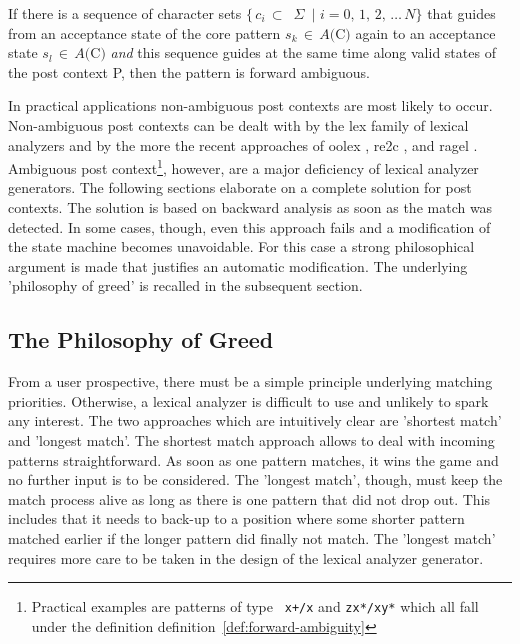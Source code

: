 \documentclass[acmtoplas]{acmtrans2m}
\newcommand{\defref}[1]{definition~\ref{def:#1}}
\newcommand{\pP}{{\sf P}}
\newcommand{\pC}{{\sf C}}
\begin{document}
\begin{samepage}
\begin{definition}\label{def:forward-ambiguity}
If there is a sequence of character sets\linebreak
$\{\, c_i\,\subset$~$\Sigma$~$|$ $i=0,\,1,\,2,\,\ldots \,N\}$
that guides from an acceptance state of the core pattern $s_k\,\in\,A($\pC$)$
again to an acceptance state $s_l\,\in\,A($\pC$)$
{\it and} this sequence guides at the same time along valid
states of the post context \pP, then the pattern is forward ambiguous. 
\end{definition}
\end{samepage}

In practical applications non-ambiguous post contexts are most likely to occur.
Non-ambiguous post contexts can be dealt with by the lex family of lexical
analyzers and by the more the recent approaches of oolex
\cite{Kuehl:2002}, re2c \cite{Bumbulis:1993}, and ragel \cite{Thurston:2006}.
Ambiguous post context\footnote{Practical examples are patterns of type {\tt
    x+/x} and {\tt zx*/xy*} which all fall under the definition
        \defref{forward-ambiguity}}, however, are a major deficiency of lexical
        analyzer generators. The following sections elaborate on a complete
        solution for post contexts. The solution is based on backward analysis
        as soon as the match was detected.  In some cases, though, even this
        approach fails and a modification of the state machine becomes
        unavoidable. For this case a strong philosophical argument is made that
        justifies an automatic modification. The underlying 'philosophy of
        greed' is recalled in the subsequent section.

\subsection{The Philosophy of Greed}
\label{sec:philosophy-greed}

From a user prospective, there must be a simple principle underlying  matching
priorities. Otherwise, a lexical analyzer is difficult to use and unlikely to
spark any interest. The two approaches which are intuitively clear are
'shortest match' and 'longest match'. The shortest match
approach allows to deal with incoming patterns straightforward. As soon as one
pattern matches, it wins the game and no further input is to be considered. The
'longest match', though, must keep the match process alive as long as there is
one pattern that did not drop out. This includes that it needs to back-up to a
position where some shorter pattern matched earlier if the longer pattern did
finally not match. The 'longest match' requires more care to be taken in the
design of the lexical analyzer generator.
\end{document}
